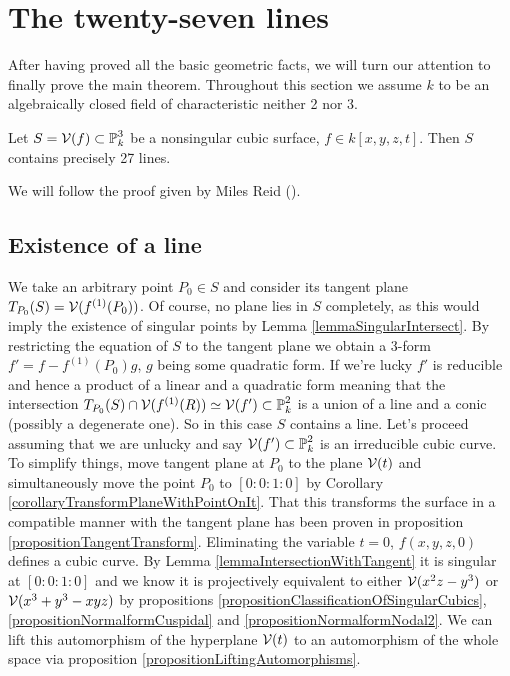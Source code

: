\section{The twenty-seven lines}

After having proved all the basic geometric facts, we will turn our attention to finally prove the main theorem. Throughout this section we assume $k$ to be an algebraically closed field of characteristic neither 2 nor 3.
\begin{theorem}
Let $S = \operatorname{\mathcal V}(f) \subset \operatorname{\mathbb P}^3_k$ be a nonsingular cubic surface, $f\in k[x,y,z,t]$.
Then $S$ contains precisely 27 lines.
\end{theorem}
We will follow the proof given by Miles Reid (\cite[§7]{reid1988undergraduate}).

\subsection{Existence of a line}

We take an arbitrary point $P_0 \in S$ and consider its tangent plane $T_{P_0}(S) = \operatorname{\mathcal V}(f^{(1)}(P_0))$.
Of course, no plane lies in $S$ completely, as this would imply the existence of singular points by Lemma \ref{lemmaSingularIntersect}.
By restricting the equation of $S$ to the tangent plane we obtain a 3-form $f' = f - f^{(1)}(P_0)g$, $g$ being some quadratic form.
If we're lucky $f'$ is reducible and hence a product of a linear and a quadratic form meaning that the intersection $T_{P_0}(S) \cap \operatorname{\mathcal V}(f^{(1)}(R)) \simeq \operatorname{\mathcal V}(f') \subset \operatorname{\mathbb P}^2_k$ is a union of a line and a conic (possibly a degenerate one).
So in this case $S$ contains a line.
Let's proceed assuming that we are unlucky and say $\operatorname{\mathcal V}(f') \subset \operatorname{\mathbb P}^2_k$ is an irreducible cubic curve.
To simplify things, move tangent plane at $P_0$ to the plane $\operatorname{\mathcal V}(t)$ and simultaneously move the point $P_0$ to $[0:0:1:0]$ by Corollary \ref{corollaryTransformPlaneWithPointOnIt}.
That this transforms the surface in a compatible manner with the tangent plane has been proven in proposition \ref{propositionTangentTransform}.
Eliminating the variable $t = 0$, $f(x,y,z,0)$ defines a cubic curve.
By Lemma \ref{lemmaIntersectionWithTangent} it is singular at $[0:0:1:0]$ and we know it is projectively equivalent to either $\operatorname{\mathcal V}(x^2z - y^3)$ or $\operatorname{\mathcal V}(x^3 + y^3 - xyz)$ by propositions \ref{propositionClassificationOfSingularCubics}, \ref{propositionNormalformCuspidal} and \ref{propositionNormalformNodal2}.
We can lift this automorphism of the hyperplane $\operatorname{\mathcal V}(t)$ to an automorphism of the whole space via proposition \ref{propositionLiftingAutomorphisms}.

